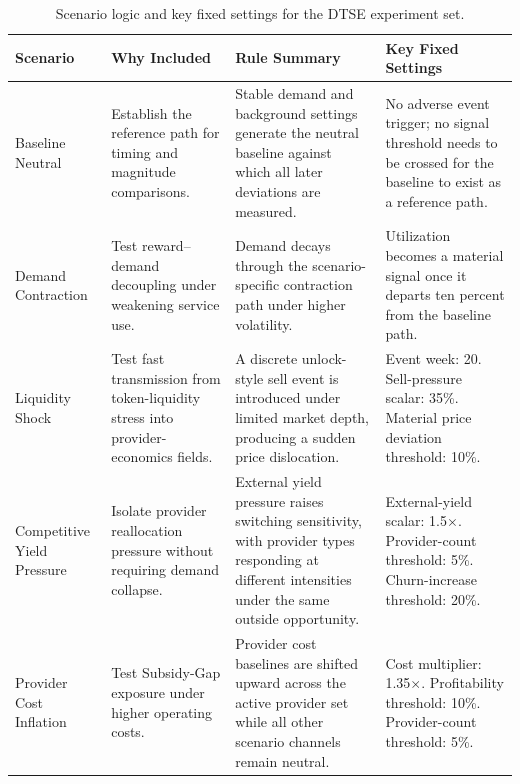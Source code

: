 \begin{table}[H]
    \centering
    \small
    \renewcommand{\arraystretch}{1.15}
    \setlength{\tabcolsep}{4pt}
    \begin{tabularx}{\textwidth}{@{}>{\raggedright\arraybackslash}p{}>{\raggedright\arraybackslash}p{}>{\raggedright\arraybackslash}p{}X@{}}
        \toprule
        \textbf{Scenario} & \textbf{Why Included} & \textbf{Rule Summary} & \textbf{Key Fixed Settings} \\
        \midrule
        Baseline Neutral &
        Establish the reference path for timing and magnitude comparisons. &
        Stable demand and background settings generate the neutral baseline against which all later deviations are measured. &
        No adverse event trigger; no signal threshold needs to be crossed for the baseline to exist as a reference path. \\
        \addlinespace
        Demand Contraction &
        Test reward--demand decoupling under weakening service use. &
        Demand decays through the scenario-specific contraction path under higher volatility. &
        Utilization becomes a material signal once it departs ten percent from the baseline path. \\
        \addlinespace
        Liquidity Shock &
        Test fast transmission from token-liquidity stress into provider-economics fields. &
        A discrete unlock-style sell event is introduced under limited market depth, producing a sudden price dislocation. &
        Event week: 20. Sell-pressure scalar: 35\%. Material price deviation threshold: 10\%. \\
        \addlinespace
        Competitive Yield Pressure &
        Isolate provider reallocation pressure without requiring demand collapse. &
        External yield pressure raises switching sensitivity, with provider types responding at different intensities under the same outside opportunity. &
        External-yield scalar: 1.5$\times$. Provider-count threshold: 5\%. Churn-increase threshold: 20\%. \\
        \addlinespace
        Provider Cost Inflation &
        Test Subsidy-Gap exposure under higher operating costs. &
        Provider cost baselines are shifted upward across the active provider set while all other scenario channels remain neutral. &
        Cost multiplier: 1.35$\times$. Profitability threshold: 10\%. Provider-count threshold: 5\%. \\
        \bottomrule
    \end{tabularx}
    \caption{Scenario logic and key fixed settings for the DTSE experiment set.}
    \label{tab:app_dtse_scenario_formula_map}
\end{table}

